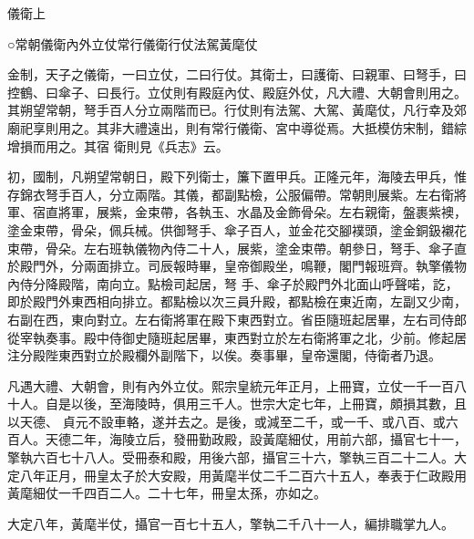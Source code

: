 
\begin{pinyinscope}

 儀衛上



 ○常朝儀衛內外立仗常行儀衛行仗法駕黃麾仗



 金制，天子之儀衛，一曰立仗，二曰行仗。其衛士，曰護衛、曰親軍、曰弩手，曰控鶴、曰傘子、曰長行。立仗則有殿庭內仗、殿庭外仗，凡大禮、大朝會則用之。其朔望常朝，弩手百人分立兩階而已。行仗則有法駕、大駕、黃麾仗，凡行幸及郊廟祀享則用之。其非大禮遠出，則有常行儀衛、宮中導從焉。大抵模仿宋制，錯綜增損而用之。其宿
 衛則見《兵志》云。



 初，國制，凡朔望常朝日，殿下列衛士，簾下置甲兵。正隆元年，海陵去甲兵，惟存錦衣弩手百人，分立兩階。其儀，都副點檢，公服偏帶。常朝則展紫。左右衛將軍、宿直將軍，展紫，金束帶，各執玉、水晶及金飾骨朵。左右親衛，盤裹紫襖，塗金束帶，骨朵，佩兵械。供御弩手、傘子百人，並金花交腳襆頭，塗金銅鈒襯花束帶，骨朵。左右班執儀物內侍二十人，展紫，塗金束帶。朝參日，弩手、傘子直於殿門外，分兩面排立。司辰報時畢，皇帝御殿坐，鳴鞭，閣門報班齊。執擎儀物內侍分降殿階，南向立。點檢司起居，弩
 手、傘子於殿門外北面山呼聲喏，訖，即於殿門外東西相向排立。都點檢以次三員升殿，都點檢在東近南，左副又少南，右副在西，東向對立。左右衛將軍在殿下東西對立。省臣隨班起居畢，左右司侍郎從宰執奏事。殿中侍御史隨班起居畢，東西對立於左右衛將軍之北，少前。修起居注分殿陛東西對立於殿欄外副階下，以俟。奏事畢，皇帝還閣，侍衛者乃退。



 凡遇大禮、大朝會，則有內外立仗。熙宗皇統元年正月，上冊寶，立仗一千一百八十人。自是以後，至海陵時，俱用三千人。世宗大定七年，上冊寶，頗損其數，且以天德、
 貞元不設車輅，遂并去之。是後，或減至二千，或一千、或八百、或六百人。天德二年，海陵立后，發冊勤政殿，設黃麾細仗，用前六部，攝官七十一，擎執六百七十八人。受冊泰和殿，用後六部，攝官三十六，擎執三百二十二人。大定八年正月，冊皇太子於大安殿，用黃麾半仗二千二百六十五人，奉表于仁政殿用黃麾細仗一千四百二人。二十七年，冊皇太孫，亦如之。



 大定八年，黃麾半仗，攝官一百七十五人，擎執二千八十一人，編排職掌九人。




\end{pinyinscope}
